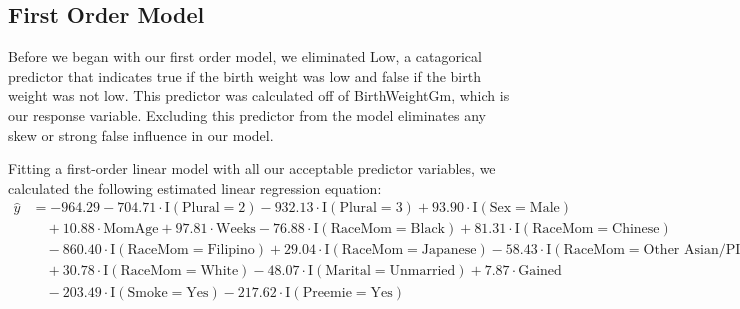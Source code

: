 \documentclass{article}\usepackage[]{graphicx}\usepackage[]{xcolor}
\begin{document}
\subsection{First Order Model}
Before we began with our first order model, we eliminated Low, a catagorical predictor that indicates true if the birth weight was low and false if the birth weight was not low. This predictor was calculated off of BirthWeightGm, which is our response variable. Excluding this predictor from the model eliminates any skew or strong false influence in our model. 

Fitting a first-order linear model with all our acceptable predictor variables, we calculated the following estimated linear regression equation: \\

\begin{align*} \hat{y} &= -964.29 - 704.71\cdot \text{I}(\text{Plural} = 2) - 932.13\cdot \text{I}(\text{Plural} = 3) + 93.90\cdot \text{I}(\text{Sex} = \text{Male}) \\ &\quad + 10.88\cdot \text{MomAge} + 97.81\cdot \text{Weeks} -76.88\cdot \text{I}(\text{RaceMom} = \text{Black}) + 81.31\cdot \text{I}(\text{RaceMom} = \text{Chinese}) \\ &\quad -860.40\cdot \text{I}(\text{RaceMom} = \text{Filipino}) + 29.04\cdot \text{I}(\text{RaceMom} = \text{Japanese}) -58.43\cdot \text{I}(\text{RaceMom} = \text{Other\ Asian/PI}) \\ &\quad + 30.78\cdot \text{I}(\text{RaceMom} = \text{White}) -48.07\cdot \text{I}(\text{Marital} = \text{Unmarried}) + 7.87\cdot \text{Gained} \\ &\quad -203.49\cdot \text{I}(\text{Smoke} = \text{Yes}) -217.62\cdot \text{I}(\text{Preemie} = \text{Yes}) \end{align*}
\end{document}

